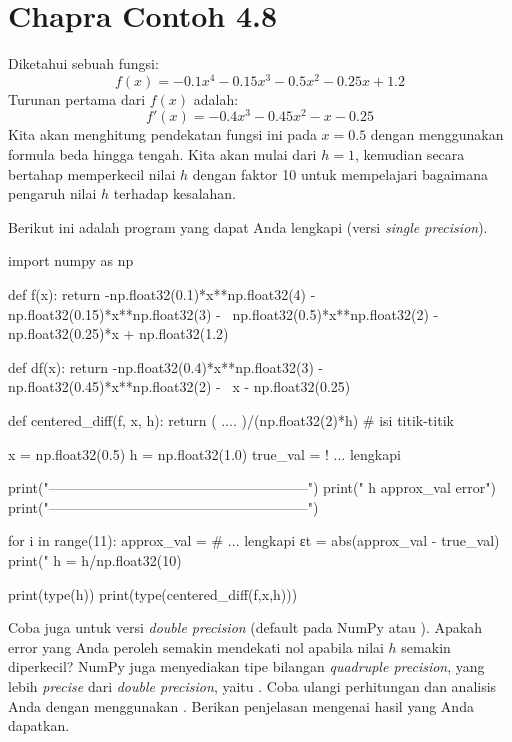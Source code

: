\section{Chapra Contoh 4.8}
Diketahui sebuah fungsi:
\begin{equation}
f(x) = -0.1x^4 - 0.15x^3 - 0.5x^2 - 0.25x + 1.2
\end{equation}
Turunan pertama dari $f(x)$ adalah:
\begin{equation}
f'(x) = -0.4x^3 - 0.45x^2 - x - 0.25
\end{equation}
Kita akan menghitung pendekatan fungsi ini pada $x=0.5$ dengan menggunakan
formula beda hingga tengah. Kita akan mulai dari $h=1$, kemudian secara bertahap
memperkecil nilai $h$ dengan faktor 10 untuk mempelajari bagaimana
pengaruh nilai $h$ terhadap kesalahan.

\begin{soal}
Berikut ini adalah program yang dapat Anda lengkapi (versi \textit{single precision}).
\begin{pythoncode}
import numpy as np

def f(x):
  return -np.float32(0.1)*x**np.float32(4) - np.float32(0.15)*x**np.float32(3) - \
  np.float32(0.5)*x**np.float32(2) - np.float32(0.25)*x + np.float32(1.2)
  
def df(x):
  return -np.float32(0.4)*x**np.float32(3) - np.float32(0.45)*x**np.float32(2) - \
  x - np.float32(0.25)
  
def centered_diff(f, x, h):
  return ( .... )/(np.float32(2)*h) # isi titik-titik
  
  x = np.float32(0.5)
  h = np.float32(1.0)
  true_val = ! ... lengkapi
  
  print("--------------------------------------------------------")
  print("           h             approx_val             error")
  print("--------------------------------------------------------")
  
for i in range(11):
  approx_val = # ... lengkapi
  εt = abs(approx_val - true_val)
  print("%
  h = h/np.float32(10)

print(type(h))
print(type(centered_diff(f,x,h)))  
\end{pythoncode}
Coba juga untuk versi \textit{double precision} (default pada NumPy
atau ).
Apakah error yang Anda peroleh semakin mendekati nol apabila nilai $h$ semakin
diperkecil?
NumPy juga menyediakan tipe bilangan \textit{quadruple precision}, yang lebih
\textit{precise} dari \textit{double precision}, yaitu
. Coba ulangi perhitungan dan analisis Anda dengan
menggunakan \txtinline{np.float128}.
Berikan penjelasan mengenai hasil yang Anda dapatkan.
\end{soal}